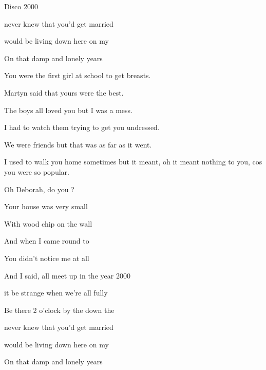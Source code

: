 \begin{song}{Disco 2000}{
	
	\chordset[Intro]{ \FMaj \FMajsusFour \BbMajShE \BbMajsusFourShE }	
	\chordset[Verse]{ \FMaj \BbMaj }

	\chordset[Chorus]{ \Cm \BbMaj \Dm \Gm \FMaj }
	
}
\begin{songchorus}
		 never knew that you'd get married 
                             
		 would be living down here on my    

		On that damp and lonely  years  
	\end{songchorus}

	\begin{songverse}
		
		You were the first girl at school to get breasts.
		
		Martyn said that yours were the best.
		
		The boys all loved you but I was a mess.
		
		I had to watch them trying to get you undressed.
		
		We were friends but that was as far as it went.
		
		I used to walk you home sometimes but it meant,
		oh it meant nothing to you,
		cos you were so popular.
	\end{songverse}
	
	 \begin{songverse*}[Bridge]	     
	                  
		Oh Deborah, do you ?

		Your house was very small

		With wood chip on the wall
                         
		And when I came round to 

		You didn't notice me at all 		
	 \end{songverse*}

 \begin{songchorus}
                          
		And I said,  all meet up in the year 2000
                                        
		 it be strange when we're all fully 
                                          
		Be there 2 o'clock by the  down the 

		 never knew that you'd get married 
                             
		 would be living down here on my    

		On that damp and lonely  years  
	\end{songchorus}
	

\end{song}
